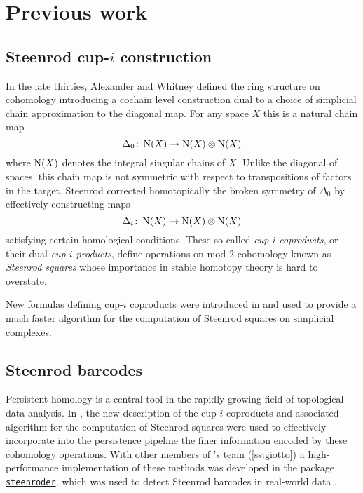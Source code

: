 \section{Previous work} \label{s:past}

\subsection{Steenrod cup-$i$ construction} \label{ss:cup-i}

In the late thirties, Alexander and Whitney defined the ring structure on cohomology introducing a cochain level construction dual to a choice of simplicial chain approximation to the diagonal map.
For any space $X$ this is a natural chain map
\[
\Delta_0 \colon \operatorname{N}(X) \to \operatorname{N}(X) \otimes \operatorname{N}(X)
\]
where $\operatorname{N}(X)$ denotes the integral singular chains of $X$.
Unlike the diagonal of spaces, this chain map is not symmetric with respect to transpositions of factors in the target.
Steenrod \cite{steenrod1947products} corrected homotopically the broken symmetry of $\Delta_0$ by effectively constructing maps
\begin{equation*}
\Delta_i \colon \operatorname{N}(X) \to \operatorname{N}(X) \otimes \operatorname{N}(X)
\end{equation*}
satisfying certain homological conditions.
These so called \textit{cup-$i$ coproducts}, or their dual \textit{cup-$i$ products}, define operations on mod $2$ cohomology known as \textit{Steenrod squares} whose importance in stable homotopy theory is hard to overstate.

New formulas defining cup-$i$ coproducts were introduced in \cite{medina2023fast_sq} and used to provide a much faster algorithm for the computation of Steenrod squares on simplicial complexes.

\subsection{Steenrod barcodes} \label{ss:steenroder}

Persistent homology is a central tool in the rapidly growing field of topological data analysis.
In \cite{medina2022per_st}, the new description of the cup-$i$ coproducts and associated algorithm for the computation of Steenrod squares were used to effectively incorporate into the persistence pipeline the finer information encoded by these cohomology operations.
With other members of \giottoTDA's team (\cref{ss:giotto}) a high-performance implementation of these methods was developed in the package \href{https://steenroder.github.io/steenroder/}{\texttt{steenroder}}, which was used to detect Steenrod barcodes in real-world data \cite{medina2022per_st}.

